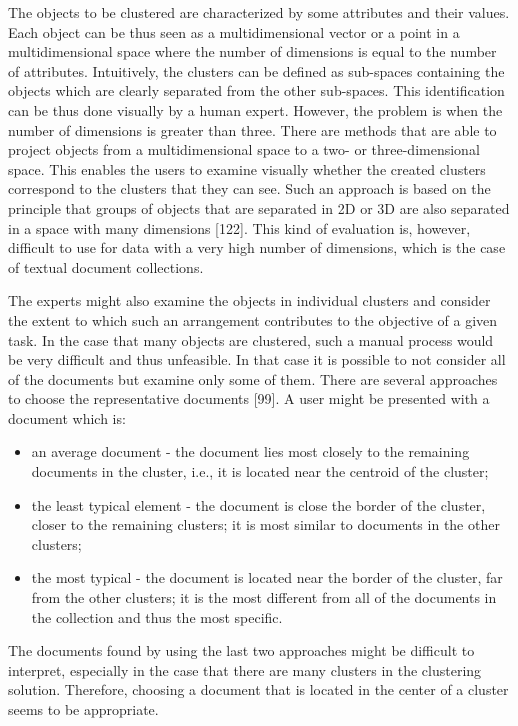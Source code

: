 \documentclass[11pt,openany,executivepaper]{book}
\begin{document}
The objects to be clustered are characterized by some attributes and their values. Each object can be thus seen as a multidimensional vector or a point in a multidimensional space where the number of dimensions is equal to the number of attributes. Intuitively, the clusters can be defined as sub-spaces containing the objects which are clearly separated from the other sub-spaces. This identification can be thus done visually by a human expert. However, the problem is when the number of dimensions is greater than three. There are methods that are able to project objects from a multidimensional space to a two- or three-dimensional space. This enables the users to examine visually whether the created clusters correspond to the clusters that they can see. Such an approach is based on the principle that groups of objects that are separated in 2D or 3D are also separated in a space with many dimensions [122]. This kind of evaluation is, however, difficult to use for data with a very high number of dimensions, which is the case of textual document collections.

The experts might also examine the objects in individual clusters and consider the extent to which such an arrangement contributes to the objective of a given task. In the case that many objects are clustered, such a manual process would\\[0pt]
be very difficult and thus unfeasible. In that case it is possible to not consider all of the documents but examine only some of them. There are several approaches to choose the representative documents [99]. A user might be presented with a document which is:

\begin{itemize}
  \item an average document - the document lies most closely to the remaining documents in the cluster, i.e., it is located near the centroid of the cluster;
  \item the least typical element - the document is close the border of the cluster, closer to the remaining clusters; it is most similar to documents in the other clusters;
  \item the most typical - the document is located near the border of the cluster, far from the other clusters; it is the most different from all of the documents in the collection and thus the most specific.
\end{itemize}

The documents found by using the last two approaches might be difficult to interpret, especially in the case that there are many clusters in the clustering solution. Therefore, choosing a document that is located in the center of a cluster seems to be appropriate.
\end{document}
